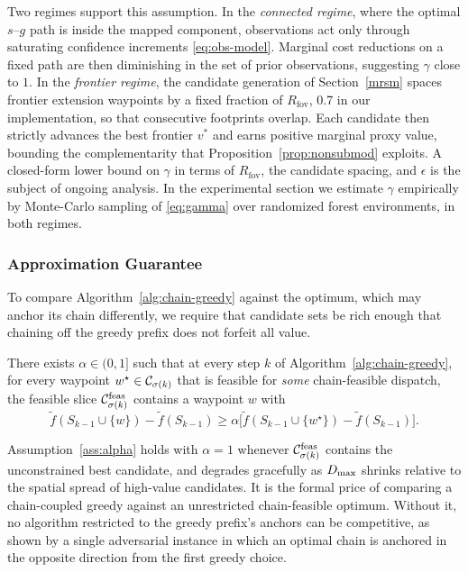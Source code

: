 \begin{remark}
\label{rem:gamma-status}
Two regimes support this assumption. In the \emph{connected regime}, where the optimal $s$--$g$ path is inside the mapped component, observations act only through saturating confidence increments \eqref{eq:obs-model}. Marginal cost reductions on a fixed path are then diminishing in the set of prior observations, suggesting $\gamma$ close to $1$. In the \emph{frontier regime}, the candidate generation of Section~\ref{mrsm} spaces frontier extension waypoints by a fixed fraction of $R_{\mathrm{fov}}$, 0.7 in our implementation, so that consecutive footprints overlap. Each candidate then strictly advances the best frontier $v^\ast$ and earns positive marginal proxy value, bounding the complementarity that Proposition~\ref{prop:nonsubmod} exploits. A closed-form lower bound on $\gamma$ in terms of $R_{\mathrm{fov}}$, the candidate spacing, and $\epsilon$ is the subject of ongoing analysis. In the experimental section we estimate $\gamma$ empirically by Monte-Carlo sampling of \eqref{eq:gamma} over randomized forest environments, in both regimes.
\end{remark}

\subsubsection{Approximation Guarantee}

To compare Algorithm~\ref{alg:chain-greedy} against the optimum, which may anchor its chain differently, we require that candidate sets be rich enough that chaining off the greedy prefix does not forfeit all value.

\begin{assumption}
\label{ass:alpha}
There exists $\alpha \in (0, 1]$ such that at every step $k$ of Algorithm~\ref{alg:chain-greedy}, for every waypoint $w^\star \in \mathcal{C}_{\sigma(k)}$ that is feasible for \emph{some} chain-feasible dispatch, the feasible slice $\mathcal{C}_{\sigma(k)}^{\mathrm{feas}}$ contains a waypoint $w$ with
\[ \tilde f(S_{k-1} \cup \{w\}) - \tilde f(S_{k-1}) \geq \alpha \bigl[ \tilde f(S_{k-1} \cup \{w^\star\}) - \tilde f(S_{k-1}) \bigr]. \]
\end{assumption}

\begin{remark}
Assumption~\ref{ass:alpha} holds with $\alpha = 1$ whenever $\mathcal{C}_{\sigma(k)}^{\mathrm{feas}}$ contains the unconstrained best candidate, and degrades gracefully as $D_{\max}$ shrinks relative to the spatial spread of high-value candidates. It is the formal price of comparing a chain-coupled greedy against an unrestricted chain-feasible optimum. Without it, no algorithm restricted to the greedy prefix's anchors can be competitive, as shown by a single adversarial instance in which an optimal chain is anchored in the opposite direction from the first greedy choice.
\end{remark}

